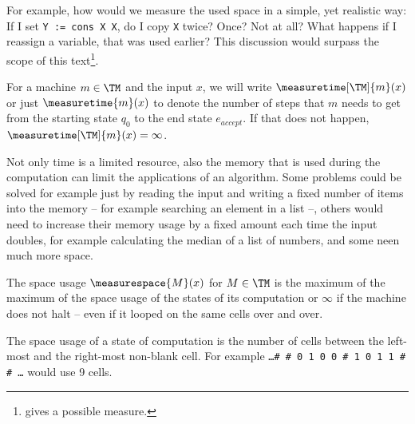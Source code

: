 For example, how would we measure the used space in a simple, yet realistic
way: If I set {\tt Y := cons X X}, do I copy {\tt X} twice? Once?  Not at all?
What happens if I reassign a variable, that was used earlier?  This discussion
would surpass the scope of this text\footnote{\cite[p. 325f]{jones} gives a
possible measure.}.

\begin{defn}
	For a machine $m\in \TM$ and the input $x$, we will write 
	$\measuretime[\TM]{m}(x)$ or just $\measuretime{m}(x)$ to denote the number 
	of steps that $m$ needs to get from the starting state $q_0$ to the end state 
	$e_{accept}$. If that does not happen, $\measuretime[\TM]{m}(x)=\infty$.
\end{defn}


Not only time is a limited resource, also the memory that is used during the 
computation can limit the applications of an algorithm. Some problems could 
be solved for example just by reading the input and writing a fixed number of 
items into the memory -- for example searching an element in a list --, others
would need to increase their memory usage by a fixed amount each time the 
input doubles, for example calculating the median of a list of numbers, and 
some neen much more space.


\begin{defn}
	The space usage $\measurespace{M}(x)$ for $M\in \TM$ is the maximum of the 
	maximum of the space usage of the states of its computation or $\infty$ if 
	the machine does not halt -- even if it looped on the same cells over and over.

	The space usage of a state of computation is the number of cells between the 
	left-most and the right-most non-blank cell. For example {\tt \dots \# \# 0 1 
	0 0 \# 1 0 1 1 \# \# \dots} would use 9 cells.
\end{defn}


